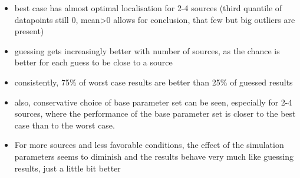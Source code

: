 \begin{itemize}
	\item best case has almost optimal localisation for 2-4 sources (third quantile of datapoints still 0, mean>0 allows for conclusion, that few but big outliers are present)
	\item guessing gets increasingly better with number of sources, as the chance is better for each guess to be close to a source
	\item consistently, 75\% of worst case results are better than 25\% of guessed results
	\item also, conservative choice of base parameter set can be seen, especially for 2-4 sources, where the performance of the base parameter set is closer to the best case than to the worst case. 
	\item For more sources and less favorable conditions, the effect of the simulation parameters seems to diminish and the results behave very much like guessing results, just a little bit better
\end{itemize}
